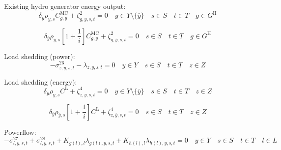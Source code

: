 \documentclass{article}
\newcommand{\sGeneratorsHydro}{G^{\mathrm{H}}}
\newcommand{\sYears}{Y}
\newcommand{\sScenarios}{S}
\newcommand{\sIntervals}{T}
\newcommand{\sZones}{Z}
\newcommand{\sLinks}{L}
\newcommand{\iGenerator}{g}
\newcommand{\iYear}{y}
\newcommand{\iYearTerminal}{\overline{\iYear}}
\newcommand{\iScenario}{s}
\newcommand{\iInterval}{t}
\newcommand{\iZone}{z}
\newcommand{\iLink}{l}
\newcommand{\cScenarioDuration}[1][\iYear,\iScenario]{\rho_{#1}}
\newcommand{\cMarginalCost}[1][\iGenerator,\iYear]{C^{\mathrm{MC}}_{#1}}
\newcommand{\cInterestRate}{i}
\newcommand{\cIncidenceMatrix}[1][\iZone,\iLink]{K_{#1}}
\newcommand{\cLostLoadCost}{C^{\mathrm{L}}}
\newcommand{\cDiscountRate}[1][\iYear]{\delta_{#1}}
\newcommand{\dNonNegativeLostLoad}[1][\iZone,\iYear,\iScenario,\iInterval]{\sigma_{#1}^{26}}
\newcommand{\dMinPowerFlow}[1][\iLink,\iYear,\iScenario,\iInterval]{\sigma_{#1}^{27}}
\newcommand{\dMaxPowerFlow}[1][\iLink,\iYear,\iScenario,\iInterval]{\sigma_{#1}^{28}}
\newcommand{\dPowerBalance}[1][\iZone,\iYear,\iScenario,\iInterval]{\lambda_{#1}}
\newcommand{\dGeneratorEnergyOutput}[1][\iGenerator,\iYear,\iScenario,\iInterval]{\zeta_{#1}^{2}}
\newcommand{\dLostLoadEnergy}[1][\iZone,\iYear,\iScenario,\iInterval]{\zeta_{#1}^{4}}
\begin{document}
Existing hydro generator energy output:
\begin{equation}
\cDiscountRate\cScenarioDuration \cMarginalCost + \dGeneratorEnergyOutput = 0 \quad \iYear \in \sYears \setminus \{\iYearTerminal\} \quad \iScenario \in \sScenarios \quad \iInterval \in \sIntervals \quad \iGenerator \in \sGeneratorsHydro
\end{equation}

\begin{equation}
\cDiscountRate[\iYearTerminal] \cScenarioDuration[\iYearTerminal,\iScenario] \left[1 + \frac{1}{\cInterestRate}\right] \cMarginalCost + \dGeneratorEnergyOutput[\iGenerator,\iYearTerminal,\iScenario,\iInterval] = 0 \quad \iScenario \in \sScenarios \quad \iInterval \in \sIntervals \quad \iGenerator \in \sGeneratorsHydro
\end{equation}

Load shedding (power):
\begin{equation}
- \dNonNegativeLostLoad - \dPowerBalance = 0 \quad \iYear \in \sYears \quad \iScenario \in \sScenarios \quad \iInterval \in \sIntervals \quad \iZone \in \sZones
\end{equation}

Load shedding (energy):
\begin{equation}
\cDiscountRate \cScenarioDuration \cLostLoadCost + \dLostLoadEnergy = 0 \quad \iYear \in \sYears \setminus \{\iYearTerminal\} \quad \iScenario \in \sScenarios \quad \iInterval \in \sIntervals \quad \iZone \in \sZones
\end{equation}

\begin{equation}
\cDiscountRate[\iYearTerminal] \cScenarioDuration[\iYearTerminal,\iScenario] \left[1 + \frac{1}{\cInterestRate}\right] \cLostLoadCost + \dLostLoadEnergy[\iZone,\iYearTerminal,\iScenario,\iInterval] = 0 \quad \iScenario \in \sScenarios \quad \iInterval \in \sIntervals \quad \iZone \in \sZones
\end{equation}

Powerflow:
\begin{equation}
-\dMinPowerFlow + \dMaxPowerFlow + \cIncidenceMatrix[g(\iLink), \iLink] \dPowerBalance[g(\iLink),\iYear,\iScenario,\iInterval] + \cIncidenceMatrix[h(\iLink), \iLink] \dPowerBalance[h(\iLink),\iYear,\iScenario,\iInterval] = 0 \quad \iYear \in \sYears \quad \iScenario \in \sScenarios \quad \iInterval \in \sIntervals \quad \iLink \in \sLinks
\end{equation}

\end{document}
